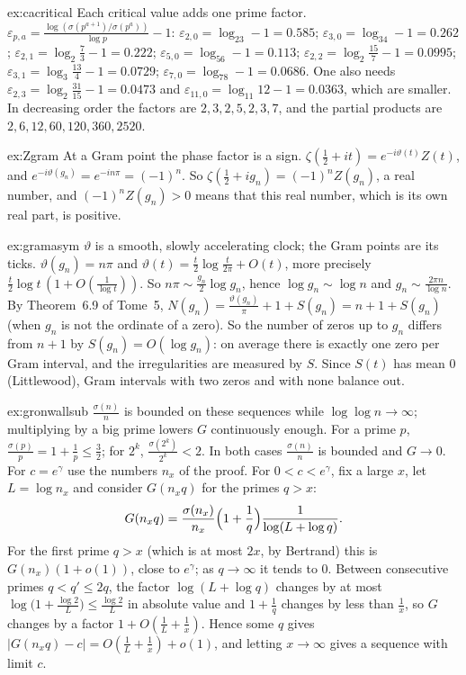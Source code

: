 \begin{solution}{ex:cacritical}
\idea Each critical value adds one prime factor.
\writeup $\varepsilon_{p,a}=\frac{\log(\sigma(p^{a+1})/\sigma(p^a))}{\log p}-1$: $\varepsilon_{2,0}=\log_23-1=0.585$; $\varepsilon_{3,0}=\log_34-1=0.262$; $\varepsilon_{2,1}=\log_2\frac73-1=0.222$;
$\varepsilon_{5,0}=\log_56-1=0.113$; $\varepsilon_{2,2}=\log_2\frac{15}7-1=0.0995$; $\varepsilon_{3,1}=\log_3\frac{13}4-1=0.0729$; $\varepsilon_{7,0}=\log_78-1=0.0686$. One also needs
$\varepsilon_{2,3}=\log_2\frac{31}{15}-1=0.0473$ and $\varepsilon_{11,0}=\log_{11}12-1=0.0363$, which are smaller. In decreasing order the factors are $2,3,2,5,2,3,7$, and the
partial products are $2,6,12,60,120,360,2520$.
\end{solution}

\begin{solution}{ex:Zgram}
\idea At a Gram point the phase factor is a sign.
\writeup $\zeta(\frac12+it)=e^{-i\vartheta(t)}Z(t)$, and $e^{-i\vartheta(g_n)}=e^{-in\pi}=(-1)^n$. So $\zeta(\frac12+ig_n)=(-1)^nZ(g_n)$, a real number, and $(-1)^nZ(g_n)>0$ means
that this real number, which is its own real part, is positive.
\end{solution}

\begin{solution}{ex:gramasym}
\idea $\vartheta$ is a smooth, slowly accelerating clock; the Gram points are its ticks.
\writeup $\vartheta(g_n)=n\pi$ and $\vartheta(t)=\frac t2\log\frac t{2\pi}+O(t)$, more precisely $\frac t2\log t\,(1+O(\frac1{\log t}))$. So $n\pi\sim\frac{g_n}2\log g_n$, hence
$\log g_n\sim\log n$ and $g_n\sim\frac{2\pi n}{\log n}$. By Theorem~6.9 of Tome~5, $N(g_n)=\frac{\vartheta(g_n)}\pi+1+S(g_n)=n+1+S(g_n)$ (when $g_n$ is not the ordinate of a
zero). So the number of zeros up to $g_n$ differs from $n+1$ by $S(g_n)=O(\log g_n)$: on average there is exactly one zero per Gram interval, and the
irregularities are measured by $S$. Since $S(t)$ has mean $0$ (Littlewood), Gram intervals with two zeros and with none balance out.
\end{solution}

\begin{solution}{ex:gronwallsub}
\idea $\frac{\sigma(n)}n$ is bounded on these sequences while $\log\log n\to\infty$; multiplying by a big prime lowers $G$ continuously enough.
\writeup For a prime $p$, $\frac{\sigma(p)}p=1+\frac1p\le\frac32$; for $2^k$, $\frac{\sigma(2^k)}{2^k}<2$. In both cases $\frac{\sigma(n)}n$ is bounded and $G\to0$.
For $c=e^\gamma$ use the numbers $n_x$ of the proof. For $0<c<e^\gamma$, fix a large $x$, let $L=\log n_x$ and consider $G(n_xq)$ for the primes $q>x$:
\[
G(n_xq)=\frac{\sigma(n_x)}{n_x}\Bigl(1+\frac1q\Bigr)\frac1{\log(L+\log q)}.
\]
For the first prime $q>x$ (which is at most $2x$, by Bertrand) this is $G(n_x)(1+o(1))$, close to $e^\gamma$; as $q\to\infty$ it tends to $0$. Between consecutive
primes $q<q'\le2q$, the factor $\log(L+\log q)$ changes by at most $\log\bigl(1+\frac{\log2}L\bigr)\le\frac{\log2}L$ in absolute value and $1+\frac1q$ changes by less than $\frac1x$,
so $G$ changes by a factor $1+O(\frac1L+\frac1x)$. Hence some $q$ gives $|G(n_xq)-c|=O(\frac1L+\frac1x)+o(1)$, and letting $x\to\infty$ gives a sequence with
limit $c$.
\end{solution}

